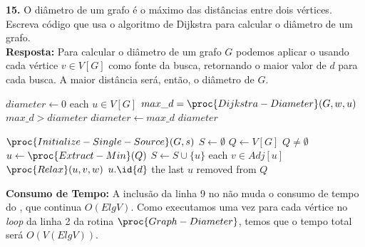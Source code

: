 
\indent\textbf{15.} O diâmetro de um grafo é o máximo das distâncias entre dois vértices. Escreva código que usa o algoritmo de Dijkstra para calcular o diâmetro de um grafo.\\[6pt]
\textbf{Resposta:} Para calcular o diâmetro de um grafo $G$ podemos aplicar o  usando cada vértice $v \in V[G]$ como fonte da busca, retornando o maior valor de $d$ para cada busca. A maior distância será, então, o diâmetro de $G$.

\begin{codebox}
\li $diameter \gets 0$
\li \For each $u \in V[G]$
\li \Do
        $max\_d = \proc{Dijkstra-Diameter}(G, w, u)$
\li     \If $max\_d > diameter$
\li     \Then 
            $diameter \gets max\_d$
        \End
    \End
\li \Return $diameter$
\end{codebox}

\begin{codebox}
\li $\proc{Initialize-Single-Source}(G, s)$
\li $S \gets \emptyset$
\li $Q \gets V[G]$
\li \While $Q \neq \emptyset$
\li \Do
        $u \gets \proc{Extract-Min}(Q)$
\li     $S \gets S \cup \{u\}$
\li     \For each $v \in Adj[u]$
\li     \Do
            $\proc{Relax}(u, v, w)$
        \End
    \End
\li \Return $u.\id{d}$ \Comment the last $u$ removed from $Q$
\end{codebox}

\textbf{Consumo de Tempo:} A inclusão da linha 9 no  não muda o consumo de tempo do , que continua $O(E lg V)$. Como executamos uma vez para cada vértice no \textit{loop} da linha 2 da rotina $\proc{Graph-Diameter}$, temos que o tempo total será $O(V(E lg V))$.\\[6pt]